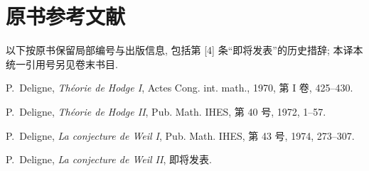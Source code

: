 \section*{原书参考文献}
\begingroup\small\raggedright
\noindent 以下按原书保留局部编号与出版信息, 包括第 [4] 条“即将发表”的历史措辞; 本译本统一引用号另见卷末书目.
\begin{enumerate}[{[1]}]
\item P.~Deligne, \emph{Théorie de Hodge I}, Actes Cong. int. math., 1970, 第 I 卷, 425--430.
\item P.~Deligne, \emph{Théorie de Hodge II}, Pub. Math. IHES, 第 40 号, 1972, 1--57.
\item P.~Deligne, \emph{La conjecture de Weil I}, Pub. Math. IHES, 第 43 号, 1974, 273--307.
\item P.~Deligne, \emph{La conjecture de Weil II}, 即将发表.
\end{enumerate}
\endgroup

